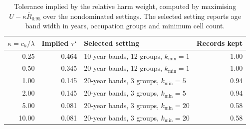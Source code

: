 \begin{table}[t]
\centering
\caption{Tolerance implied by the relative harm weight, computed by maximising $U - \kappa \overline{R}_{0.95}$ over the nondominated settings. The selected setting reports age band width in years, occupation groups and minimum cell count.}
\label{tab:tau}
\begin{tabular}{rrlr}
\toprule
$\kappa = c_h/\lambda$ & Implied $\tau^\star$ & Selected setting & Records kept \\
\midrule
0.25 & 0.464 & 10-year bands, 12 groups, $k_{\min} = 1$ & 1.00 \\
0.50 & 0.345 & 20-year bands, 12 groups, $k_{\min} = 1$ & 1.00 \\
1.00 & 0.145 & 20-year bands, 3 groups, $k_{\min} = 5$ & 0.94 \\
2.00 & 0.145 & 20-year bands, 3 groups, $k_{\min} = 5$ & 0.94 \\
5.00 & 0.081 & 20-year bands, 3 groups, $k_{\min} = 20$ & 0.58 \\
10.00 & 0.081 & 20-year bands, 3 groups, $k_{\min} = 20$ & 0.58 \\
\bottomrule
\end{tabular}
\end{table}
